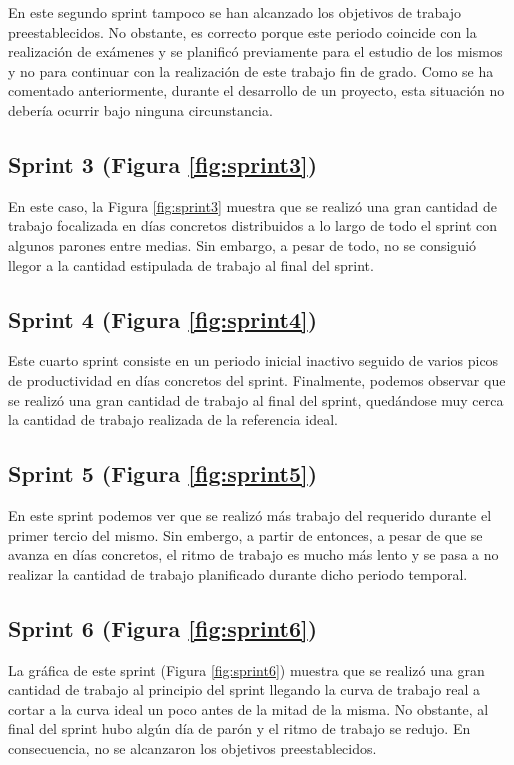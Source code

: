 En este segundo sprint tampoco se han alcanzado los objetivos de trabajo preestablecidos. No obstante, es correcto porque este periodo coincide con la realización de exámenes y se planificó previamente para el estudio de los mismos y no para continuar con la realización de este trabajo fin de grado. Como se ha comentado anteriormente, durante el desarrollo de un proyecto, esta situación no debería ocurrir bajo ninguna circunstancia.

\subsection{Sprint 3 (Figura \ref{fig:sprint3})}

En este caso, la Figura \ref{fig:sprint3} muestra que se realizó una gran cantidad de trabajo focalizada en días concretos distribuidos a lo largo de todo el sprint con algunos parones entre medias. Sin embargo, a pesar de todo, no se consiguió llegor a la cantidad estipulada de trabajo al final del sprint.

\subsection{Sprint 4 (Figura \ref{fig:sprint4})}

Este cuarto sprint consiste en un periodo inicial inactivo seguido de varios picos de productividad en días concretos del sprint. Finalmente, podemos observar que se realizó una gran cantidad de trabajo al final del sprint, quedándose muy cerca la cantidad de trabajo realizada de la referencia ideal.

\subsection{Sprint 5 (Figura \ref{fig:sprint5})}

En este sprint podemos ver que se realizó más trabajo del requerido durante el primer tercio del mismo. Sin embergo, a partir de entonces, a pesar de que se avanza en días concretos, el ritmo de trabajo es mucho más lento y se pasa a no realizar la cantidad de trabajo planificado durante dicho periodo temporal.

\subsection{Sprint 6 (Figura \ref{fig:sprint6})}

La gráfica de este sprint (Figura \ref{fig:sprint6}) muestra que se realizó una gran cantidad de trabajo al principio del sprint llegando la curva de trabajo real a cortar a la curva ideal un poco antes de la mitad de la misma. No obstante, al final del sprint hubo algún día de parón y el ritmo de trabajo se redujo. En consecuencia, no se alcanzaron los objetivos preestablecidos.

